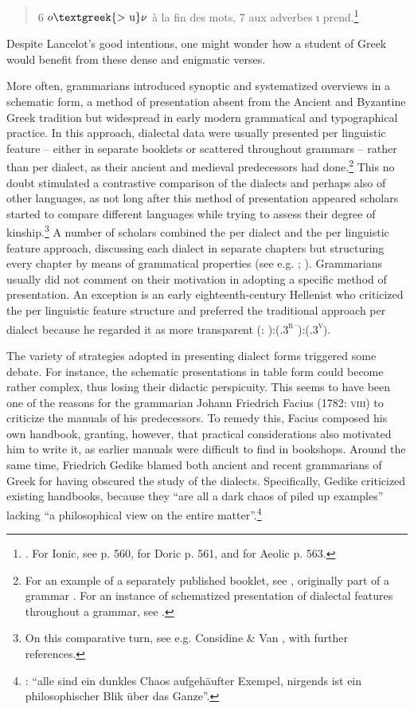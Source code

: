 \documentclass[output=paper]{langsci/langscibook}
\begin{document}
\begin{quote}
6 $o\text{\textgreek{>~u}}\nu $ à la fin des mots, 7 aux adverbes ι prend.\footnote{\citet[558]{Lancelot1655}. For Ionic, see p. 560, for Doric p. 561, and for Aeolic p. 563.}
\end{quote}

Despite Lancelot’s good intentions, one might wonder how a student of Greek would benefit from these dense and enigmatic verses.

More often, grammarians introduced synoptic and systematized overviews in a schematic form, a method of presentation absent from the Ancient and Byzantine Greek tradition but widespread in early modern grammatical and typographical practice. In this approach, dialectal data were usually presented per linguistic feature – either in separate booklets or scattered throughout grammars – rather than per dialect, as their ancient and medieval predecessors had done.\footnote{For an example of a separately published booklet, see \citet{Amerot1530}, originally part of a grammar \citep{Amerot1520}. For an instance of schematized presentation of dialectal features throughout a grammar, see \citet{Gretser1593}.} This no doubt stimulated a contrastive comparison of the dialects and perhaps also of other languages, as not long after this method of presentation appeared scholars started to compare different languages while trying to assess their degree of kinship.\footnote{On this comparative turn, see e.g. Considine \& Van \citet{Hal2010}, with further references.} A number of scholars combined the per dialect and the per linguistic feature approach, discussing each dialect in separate chapters but structuring every chapter by means of grammatical properties (see e.g. \citealt{Zwinger1605}; \citealt{Mérigon1621}). Grammarians usually did not comment on their motivation in adopting a specific method of presentation. An exception is an early eighteenth-century Hellenist who criticized the per linguistic feature structure and preferred the traditional approach per dialect because he regarded it as more transparent (\citealt{Heupel1712}: ):(.3\textsc{\textsuperscript{r–}}):(.3\textsc{\textsuperscript{v}}).

The variety of strategies adopted in presenting dialect forms triggered some debate. For instance, the schematic presentations in table form could become rather complex, thus losing their didactic perspicuity. This seems to have been one of the reasons for the grammarian Johann Friedrich Facius (1782: \textsc{viii}) to criticize the manuals of his predecessors. To remedy this, Facius composed his own handbook, granting, however, that practical considerations also motivated him to write it, as earlier manuals were difficult to find in bookshops. Around the same time, Friedrich Gedike blamed both ancient and recent grammarians of Greek for having obscured the study of the dialects. Specifically, Gedike criticized existing handbooks, because they “are all a dark chaos of piled up examples” lacking “a philosophical view on the entire matter”.\footnote{\citet[4]{Gedike1782}: “alle sind ein dunkles Chaos aufgehäufter Exempel, nirgends ist ein philosophischer Blik über das Ganze”.}
\end{document}
